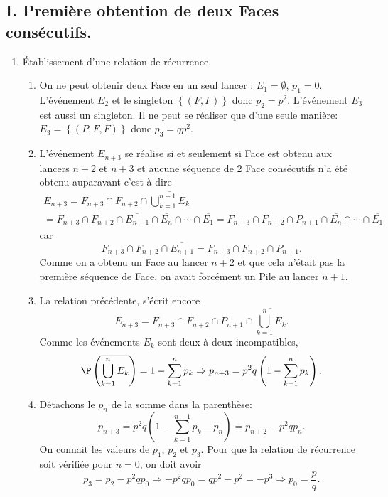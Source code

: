 \subsection*{I. Première obtention de deux Faces consécutifs.}
\begin{enumerate}
 \item \'Etablissement d'une relation de récurrence.
\begin{enumerate}
 \item On ne peut obtenir deux Face en un seul lancer : $E_1=\emptyset$, $p_1=0$. L'événement $E_2$ et le singleton $\left\lbrace (F,F)\right\rbrace $ donc $p_2 = p^2$. L'événement $E_3$ est aussi un singleton. Il ne peut se réaliser que d'une seule manière: $E_3 =\left\lbrace (P, F,F)\right\rbrace $ donc $p_3 = q p^2$.
 \item L'événement $E_{n+3}$ se réalise si et seulement si Face est obtenu aux lancers $n+2$ et $n+3$ et aucune séquence de 2 Face consécutifs n'a été obtenu auparavant c'est à dire 
\begin{multline*}
 E_{n+3} = F_{n+3} \cap F_{n+2} \cap \overline{\bigcup_{k=1}^{n+1} E_k} \\
 = F_{n+3} \cap F_{n+2} \cap \overline{E_{n+1}} \cap \overline{E_{n}} \cap \cdots \cap \overline{E_{1}}
 = F_{n+3} \cap F_{n+2} \cap P_{n+1} \cap \overline{E_{n}} \cap \cdots \cap \overline{E_{1}}
\end{multline*}
car 
\begin{displaymath}
 F_{n+3} \cap F_{n+2} \cap \overline{E_{n+1}} = F_{n+3} \cap F_{n+2} \cap P_{n+1}.
\end{displaymath}
Comme on a obtenu un Face au lancer $n+2$ et que cela n'était pas la première séquence de Face, on avait forcément un Pile au lancer $n+1$.

 \item La relation précédente, s'écrit encore
\begin{displaymath}
 E_{n+3} = F_{n+3} \cap F_{n+2} \cap P_{n+1} \cap \overline{\bigcup_{k=1}^{n} E_k}.
\end{displaymath}
Comme les événements $E_k$ sont deux à deux incompatibles,
\begin{displaymath}
 \P \left( \overline{\bigcup_{k=1}^{n} E_k} \right) = 1 - \sum_{k=1}^{n}p_k 
 \Rightarrow 
 p_{n+3} = p^2q\left( 1 - \sum_{k=1}^{n}p_k \right) .
\end{displaymath}

 \item Détachons le $p_n$ de la somme dans la parenthèse:
\begin{displaymath}
p_{n+3} = p^2q\left( 1 -\sum_{k=1}^{n-1}p_k -p_n\right)
= p_{n+2} -p^2qp_n.
\end{displaymath}
On connait les valeurs de $p_1$, $p_2$ et $p_3$. Pour que la relation de récurrence soit vérifiée pour $n=0$, on doit avoir
\begin{displaymath}
 p_3 = p_2 -p^2q p_0 \Rightarrow -p^2q p_0 = qp^2 - p^2 = -p^3
 \Rightarrow p_0 = \frac{p}{q}.
\end{displaymath}


\end{enumerate}
\end{enumerate}
